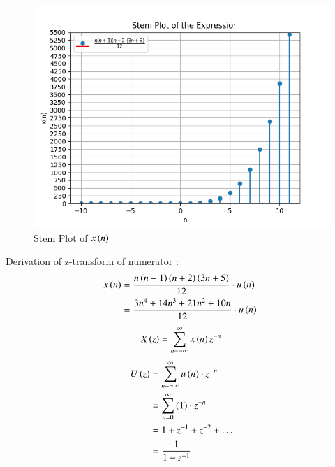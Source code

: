 \documentclass[journal,12pt,twocolumn]{IEEEtran}
\theoremstyle{remark}
\begin{document}
\begin{enumerate}
\begin{figure}[h]
    \includegraphics[width=1\columnwidth]{Figure_1.png}
    \caption{Stem Plot of $x\left(n\right)$}
\end{figure}
    
Derivation of z-transform of numerator :
\begin{align}
    x\left(n\right) &= \frac{n\left(n+1\right)\left(n+2\right)\left(3n+5\right)}{12}\cdot u\left(n\right)\\
         &= \frac{3n^4 + 14n^3 + 21n^2 + 10n}{12}\cdot u\left(n\right)\
\end{align}
\begin{equation}
    X\left(z\right) = \sum_{n=-\infty}^\infty x\left(n\right)z^{-n}
\end{equation}
    \begin{align}
U\left(z\right) &= \sum_{n=-\infty}^{\infty} u\left(n\right)\cdot z^{-n} \\
     &= \sum_{n=0}^{\infty} \left(1\right) \cdot z^{-n} \\
     &= 1 + z^{-1} + z^{-2} + \ldots \\
     &= \frac{1}{1 - z^{-1}} 
\end{align}


\end{enumerate}
\end{document}

